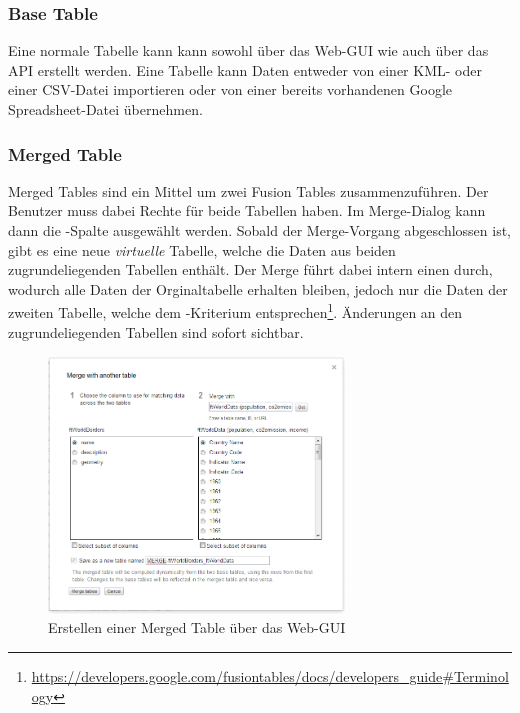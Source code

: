 \subsubsection{Base Table}
Eine normale Tabelle kann kann sowohl über das Web-GUI wie auch über das API erstellt werden. Eine Tabelle kann Daten entweder von einer \gls{KML}- oder einer \gls{CSV}-Datei importieren oder von einer bereits vorhandenen Google Spreadsheet-Datei übernehmen.

\subsubsection{Merged Table}
\label{merge-table}
Merged Tables sind ein Mittel um zwei Fusion Tables zusammenzuführen. Der Benutzer muss dabei Rechte für beide Tabellen haben. Im \gls{Merge}-Dialog kann dann die -Spalte ausgewählt werden. Sobald der \gls{Merge}-Vorgang abgeschlossen ist, gibt es eine neue \emph{virtuelle} Tabelle, welche die Daten aus beiden zugrundeliegenden Tabellen enthält. Der \gls{Merge} führt dabei intern einen  durch, wodurch alle Daten der Orginaltabelle erhalten bleiben, jedoch nur die Daten der zweiten Tabelle, welche dem -Kriterium entsprechen\footnote{ \url{https://developers.google.com/fusiontables/docs/developers_guide\#Terminology}}. Änderungen an den zugrundeliegenden Tabellen sind sofort sichtbar.

\begin{figure}[!ht]
	\centering
	\includegraphics[width=0.7\textwidth]{images/usecase1-worlddata/documentation/worlddata-merge2}
	\caption{Erstellen einer Merged Table über das Web-GUI}
	\label{create-merge-table}
\end{figure}

